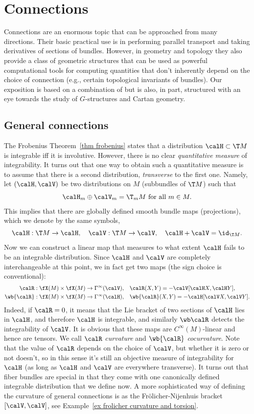 \chapter{Connections}

Connections are an enormous topic that can be approached from many directions. Their basic practical use is in performing parallel transport and taking derivatives of sections of bundles. However, in geometry and topology they also provide a class of geometric structures that can be used as powerful computational tools for computing quantities that don't inherently depend on the choice of connection (e.g., certain topological invariants of bundles). Our exposition is based on a combination of \cite{Vakar,RS2,Kolar} but is also, in part, structured with an eye towards the study of $G$-structures and Cartan geometry.

\section{General connections}\label{sec general connections}

The Frobenius Theorem~\ref{thm frobenius} states that a distribution $\calH\subset \T M$ is integrable iff it is involutive. However, there is no clear \emph{quantitative measure} of integrability. It turns out that one way to obtain such a quantitative measure is to assume that there is a second distribution, \emph{transverse} to the first one. Namely, let $(\calH,\calV)$ be two distributions on $M$ (subbundles of $\T M$) such that
\[\calH_m\oplus \calV_m=\T_mM \text{ for all }m\in M.\]
This implies that there are globally defined smooth bundle maps (projections), which we denote by the same symbols,
\[\calH:\T M\to \calH,\quad \calV:\T M\to \calV,\quad \calH+\calV=\id_{\T M}.\]
Now we can construct a linear map that measures to what extent $\calH$ fails to be an integrable distribution. Since $\calH$ and $\calV$ are completely interchangeable at this point, we in fact get two maps (the sign choice is conventional):
\begin{align}
    \calR:\fX(M)\times\fX(M)\to \Gamma^\infty(\calV),\quad & \calR(X,Y)=-\calV[\calH X,\calH Y],\\
    \wb{\calR}:\fX(M)\times\fX(M)\to \Gamma^\infty(\calH),\quad & \wb{\calR}(X,Y)=-\calH[\calV X,\calV Y].
\end{align}
Indeed, if $\calR=0$, it means that the Lie bracket of two sections of $\calH$ lies in $\calH$, and therefore $\calH$ is integrable, and similarly $\wb \calR$ detects the integrability of $\calV$. It is obvious that these maps are $C^\infty(M)$-linear and hence are tensors. We call $\calR$ \emph{curvature} and $\wb{\calR}$ \emph{cocurvature}. Note that the value of $\calR$ depends on the choice of $\calV$, but whether it is zero or not doesn't, so in this sense it's still an objective measure of integrability for $\calH$ (as long as $\calH$ and $\calV$ are everywhere transverse). It turns out that fiber bundles are special in that they come with one canonically defined integrable distribution that we define now. A more sophisticated way of defining the curvature of general connections is as the Fr\"olicher-Nijenhuis bracket $[\calV,\calV]$, see Example~\ref{ex frolicher curvature and torsion}.

